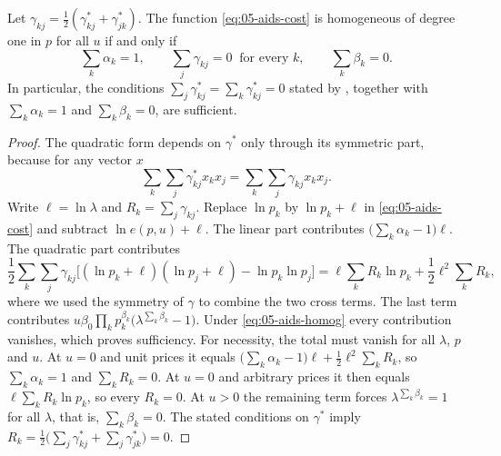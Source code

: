 \begin{proposition}\label{prop:05-aids-homog}
Let $\gamma_{kj} = \frac{1}{2}(\gamma^*_{kj} + \gamma^*_{jk})$. The function \eqref{eq:05-aids-cost} is
homogeneous of degree one in $p$ for all $u$ if and only if
\begin{equation}\label{eq:05-aids-homog}
\sum_k\alpha_k = 1, \qquad \sum_j\gamma_{kj} = 0 \ \text{ for every } k, \qquad \sum_k\beta_k = 0 .
\end{equation}
In particular, the conditions $\sum_j\gamma^*_{kj} = \sum_k\gamma^*_{kj} = 0$ stated by
\citet[p.~313]{DeatonMuellbauer1980a}, together with $\sum_k\alpha_k = 1$ and $\sum_k\beta_k = 0$, are
sufficient.
\end{proposition}

\begin{proof}
The quadratic form depends on $\gamma^*$ only through its symmetric part, because for any vector $x$
\begin{equation*}
\sum_k\sum_j\gamma^*_{kj}x_kx_j = \sum_k\sum_j\gamma_{kj}x_kx_j .
\end{equation*}
Write
$\ell = \ln\lambda$ and $R_k = \sum_j\gamma_{kj}$. Replace $\ln p_k$ by $\ln p_k + \ell$ in
\eqref{eq:05-aids-cost} and subtract $\ln e(p, u) + \ell$. The linear part contributes
$\big(\sum_k\alpha_k - 1\big)\ell$. The quadratic part contributes
\begin{equation*}
\frac{1}{2}\sum_k\sum_j\gamma_{kj}\big[(\ln p_k + \ell)(\ln p_j + \ell) - \ln p_k\ln p_j\big]
= \ell\sum_k R_k\ln p_k + \frac{1}{2}\ell^2\sum_k R_k ,
\end{equation*}
where we used the symmetry of $\gamma$ to combine the two cross terms. The last term contributes
$u\beta_0\prod_k p_k^{\beta_k}\big(\lambda^{\sum_k\beta_k} - 1\big)$. Under \eqref{eq:05-aids-homog} every
contribution vanishes, which proves sufficiency. For necessity, the total must vanish for all $\lambda$, $p$
and $u$. At $u = 0$ and unit prices it equals $\big(\sum_k\alpha_k - 1\big)\ell + \frac{1}{2}\ell^2\sum_kR_k$,
so $\sum_k\alpha_k = 1$ and $\sum_kR_k = 0$. At $u = 0$ and arbitrary prices it then equals
$\ell\sum_kR_k\ln p_k$, so every $R_k = 0$. At $u > 0$ the remaining term forces
$\lambda^{\sum_k\beta_k} = 1$ for all $\lambda$, that is, $\sum_k\beta_k = 0$. The stated conditions on
$\gamma^*$ imply $R_k = \frac{1}{2}\big(\sum_j\gamma^*_{kj} + \sum_j\gamma^*_{jk}\big) = 0$.
\end{proof}

